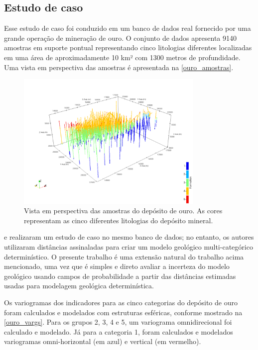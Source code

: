 \begin{figure}[H]
\end{figure}

\subsection{Estudo de caso}\label{estudo_ouro}

Esse estudo de caso foi conduzido em um banco de dados real fornecido por uma grande operação de mineração de ouro. O conjunto de dados apresenta 9140 amostras em suporte pontual representando cinco litologias diferentes localizadas em uma área de aproximadamente 10 km² com 1300 metros de profundidade. Uma vista em perspectiva das amostras é apresentada na \autoref{ouro_amostras}.

\begin{figure}[H]
	\caption{\label{ouro_amostras} Vista em perspectiva das amostras do depósito de ouro. As cores representam as cinco diferentes litologias do depósito mineral.}
	\centering
		\includegraphics[width=0.8\textwidth]{capitulo_3/imagens/points_perpect.png}
\end{figure}

 e  realizaram um estudo de caso no mesmo banco de dados; no entanto, os autores utilizaram distâncias assinaladas para criar um modelo geológico multi-categórico determinístico. O presente trabalho é uma extensão natural do trabalho acima mencionado, uma vez que é simples e direto avaliar a incerteza do modelo geológico usando campos de probabilidade a partir das distâncias estimadas usadas para modelagem geológica determinística.

Os variogramas dos indicadores para as cinco categorias do depósito de ouro foram calculados e modelados com estruturas esféricas, conforme mostrado na \autoref{ouro_vargs}. Para os grupos 2, 3, 4 e 5, um variograma omnidirecional foi calculado e modelado. Já para a categoria 1, foram calculados e modelados variogramas omni-horizontal (em azul) e vertical (em vermelho).

